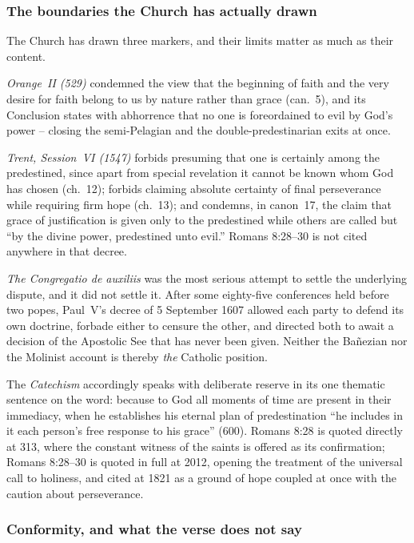 \subsubsection*{The boundaries the Church has actually drawn}

The Church has drawn three markers, and their limits matter as much as their content.

\emph{Orange~II (529)} condemned the view that the beginning of faith and the very desire for faith belong to us by nature rather than grace (can.~5), and its Conclusion states with abhorrence that no one is foreordained to evil by God's power -- closing the semi-Pelagian and the double-predestinarian exits at once.

\emph{Trent, Session~VI (1547)} forbids presuming that one is certainly among the predestined, since apart from special revelation it cannot be known whom God has chosen (ch.~12); forbids claiming absolute certainty of final perseverance while requiring firm hope (ch.~13); and condemns, in canon~17, the claim that grace of justification is given only to the predestined while others are called but ``by the divine power, predestined unto evil.'' Romans 8:28--30 is not cited anywhere in that decree.

\emph{The Congregatio de auxiliis} was the most serious attempt to settle the underlying dispute, and it did not settle it. After some eighty-five conferences held before two popes, Paul~V's decree of 5 September 1607 allowed each party to defend its own doctrine, forbade either to censure the other, and directed both to await a decision of the Apostolic See that has never been given. Neither the Ba\~nezian nor the Molinist account is thereby \emph{the} Catholic position.

The \emph{Catechism} accordingly speaks with deliberate reserve in its one thematic sentence on the word: because to God all moments of time are present in their immediacy, when he establishes his eternal plan of predestination ``he includes in it each person's free response to his grace'' (600). Romans 8:28 is quoted directly at 313, where the constant witness of the saints is offered as its confirmation; Romans 8:28--30 is quoted in full at 2012, opening the treatment of the universal call to holiness, and cited at 1821 as a ground of hope coupled at once with the caution about perseverance.

\subsubsection*{Conformity, and what the verse does not say}

